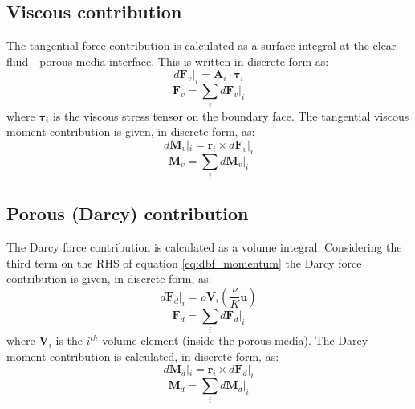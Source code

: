 \documentclass[a4paper,11pt]{report}
\begin{document}
\subsection{Viscous contribution} \label{subsec:Viscous}
The tangential force contribution is calculated as a surface integral at the clear fluid - porous media interface. This is written in discrete form as:
\begin{equation}
    d\mathbf{F}_v|_i = \mathbf{A}_i\cdot \pmb{\tau}_i
    \label{eq:dFvi}
\end{equation}
\begin{equation}
    \mathbf{F}_v = \sum_i d\mathbf{F}_v|_i
    \label{eq:Fv}
\end{equation}
where $\pmb{\tau}_i$ is the viscous stress tensor on the boundary face. The tangential viscous moment contribution is given, in discrete form, as:
\begin{equation}
    d\mathbf{M}_v|_i = \mathbf{r}_i\times d\mathbf{F}_v|_i
    \label{eq:dMvi}
\end{equation}
\begin{equation}
    \mathbf{M}_v = \sum_i d\mathbf{M}_v|_i
    \label{eq:Mv}
\end{equation}
\subsection{Porous (Darcy) contribution} \label{subsec:Darcy}
The Darcy force contribution is calculated as a volume integral. Considering the third term on the RHS of equation \ref{eq:dbf_momentum} the Darcy force contribution is given, in discrete form, as:
\begin{equation}
    d\mathbf{F}_d|_i = \rho\mathbf{V}_i(\frac{\nu}{K}\mathbf{u})
    \label{eq:dFdi}
\end{equation}
\begin{equation}
    \mathbf{F}_d = \sum_i d\mathbf{F}_d|_i
    \label{eq:Fd}
\end{equation}
where $\mathbf{V}_i$ is the $i^{th}$ volume element (inside the porous media). The Darcy moment contribution is calculated, in discrete form, as:
\begin{equation}
    d\mathbf{M}_d|_i = \mathbf{r}_i\times d\mathbf{F}_d|_i
    \label{eq:dMdi}
\end{equation}
\begin{equation}
    \mathbf{M}_d = \sum_i d\mathbf{M}_d|_i
    \label{eq:Md}
\end{equation}
\end{document}
